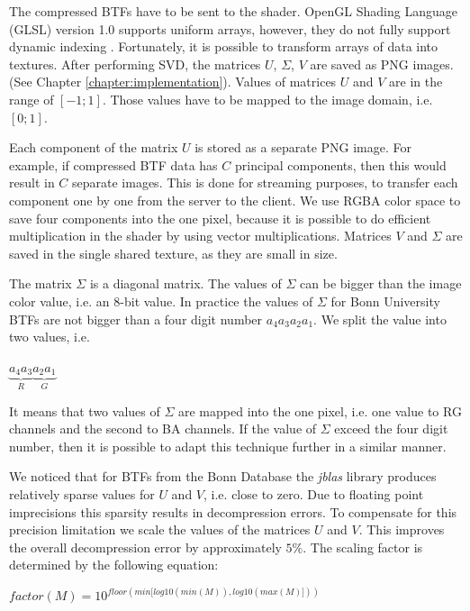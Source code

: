  
The compressed BTFs  have to be sent to the shader. 
  OpenGL Shading Language (GLSL) version 1.0 supports uniform arrays, however, they do not fully support dynamic indexing  \cite{glsl}.
Fortunately, it is possible to transform arrays of data into textures. 
After performing SVD, the matrices $U$, $\Sigma$, $V$ are saved as PNG images. (See Chapter \ref{chapter:implementation}).
Values of matrices $U$ and $V$ are in the range of $[-1;1]$.
 Those values have to be mapped to the image domain, i.e. $[0;1]$.

 Each component of the matrix $U$ is stored as a separate PNG image.
 For example, if compressed BTF data has $C$ principal components, then this would result in $C$ separate images.
 This is done for streaming purposes, to transfer each component one by one from the server to the client.
 We use  RGBA color space to save four components into the one pixel, because it is possible to do efficient multiplication in the shader by using vector multiplications.
Matrices $V$ and $\Sigma$ are saved in the single shared texture, as they are small in size.

 The matrix $\Sigma$ is a diagonal matrix.
 The values of $\Sigma$ can be bigger than the image color value, i.e. an 8-bit value.
 In practice the values of $\Sigma$ for Bonn University BTFs \cite{btfBonn} are not bigger than a four digit number $a_{4}a_{3}a_{2}a_{1}$.
We split the value into two values, i.e. 
 
{\centering$ \underbrace{a_{4}a_{3}}_{R} \underbrace{a_{2}a_{1}}_{G}$\\}
 
It means that two values of $\Sigma$ are mapped into the one pixel, i.e.  one value to RG  channels and the second to BA channels.
If the value of  $\Sigma$ exceed the four digit number, then it is possible to adapt this technique further in a similar manner.


We noticed that for BTFs from the Bonn Database \cite{btfBonn} the \emph{jblas} \cite{jblas} library produces relatively sparse values for $U$ and $V$, i.e. close to zero.
 Due to floating point imprecisions this sparsity results in decompression errors.
 To compensate for this precision limitation we scale the values of the matrices $U$ and $V$.
 This improves the overall decompression error by  approximately $5\%$.
 The scaling factor is determined by the following equation:
 
 {\centering$ factor(M)=10^{floor(min[log10(min(M)),log10(max(M)]))}$ \\}
 
